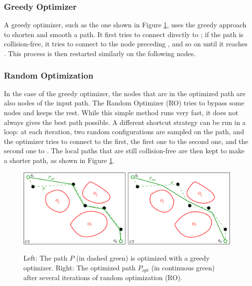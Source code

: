\subsubsection{Greedy Optimizer}

A greedy optimizer, such as the one shown in Figure
\ref{fig:chap1-optimizers}, uses the greedy approach to shorten and
smooth a path. It first tries to connect directly  to
; if the path is collision-free, it tries to connect
 to the node preceding , and so on until it
reaches . This process is then restarted similarly on the
following nodes.

\subsubsection{Random Optimization}

In the case of the greedy optimizer, the nodes that are in the
optimized path are also nodes of the input path. The Random Optimizer
(RO) tries to bypass some nodes and keeps the rest. While this simple
method runs very fast, it does not always gives the best path
possible. A different shortcut strategy can be run in a loop: at each
iteration, two random configurations are sampled on the path, and the
optimizer tries to connect  to the first, the first one to
the second one, and the second one to . The local paths that
are still collision-free are then kept to make a shorter path, as
shown in Figure \ref{fig:chap1-optimizers}.

\begin{figure}
  \centering
      {\includegraphics[width = \linewidth]
        {src/chap1-path-optimization/optimizers.pdf}}
      \caption{Left: The path $P$ (in dashed green) is optimized with
        a greedy optimizer. Right: The optimized path $P_{opt}$ (in
        continuous green) after several iterations of random
        optimization (RO).}
      \label{fig:chap1-optimizers}
\end{figure}

